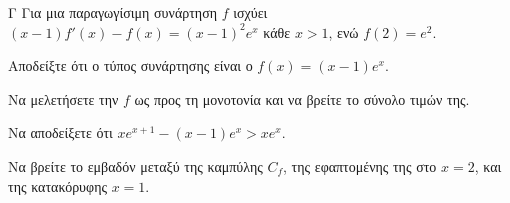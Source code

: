 \begin{thema}{Γ}
Για μια παραγωγίσιμη συνάρτηση $f$ ισχύει $(x-1) f'(x) - f(x) = (x-1)^2 e^x$  κάθε $x > 1$, ενώ $f(2) = e^2$.
\begin{erwthma}
  \item Αποδείξτε ότι ο τύπος συνάρτησης είναι ο $f(x) = (x-1)e^x$.
  \item Να μελετήσετε την $f$ ως προς τη μονοτονία και να βρείτε το σύνολο τιμών της.
  \item Να αποδείξετε ότι $x e^{x+1} - (x-1)e^x > x e^x$.
  \item Να βρείτε το εμβαδόν μεταξύ της καμπύλης $C_f$, της εφαπτομένης της στο $x=2$, και της κατακόρυφης $x=1$.
\end{erwthma}
\end{thema}
